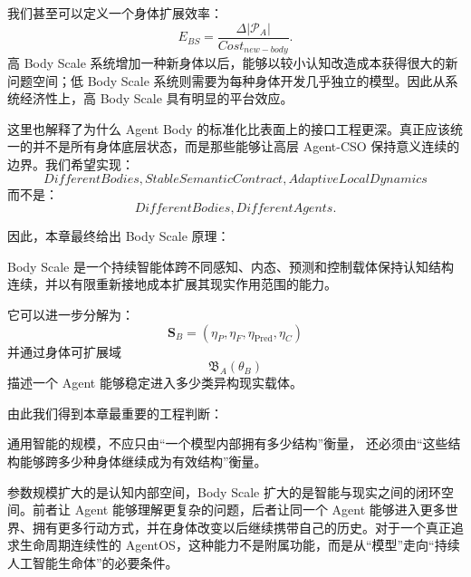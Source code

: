 我们甚至可以定义一个身体扩展效率：
\[
E_{BS}
=
\frac{
\Delta |\mathcal P_A|
}{
Cost_{new-body}
}.
\]
高 Body Scale 系统增加一种新身体以后，能够以较小认知改造成本获得很大的新问题空间；低 Body Scale 系统则需要为每种身体开发几乎独立的模型。因此从系统经济性上，高 Body Scale 具有明显的平台效应。

这里也解释了为什么 Agent Body 的标准化比表面上的接口工程更深。真正应该统一的并不是所有身体底层状态，而是那些能够让高层 Agent-CSO 保持意义连续的边界。我们希望实现：
\[
\boxed{
DifferentBodies,
StableSemanticContract,
AdaptiveLocalDynamics
}
\]
而不是：
\[
\boxed{
DifferentBodies,
DifferentAgents.
}
\]

因此，本章最终给出 Body Scale 原理：

\begin{statementbox}
Body Scale 是一个持续智能体跨不同感知、内态、预测和控制载体保持认知结构连续，并以有限重新接地成本扩展其现实作用范围的能力。
\end{statementbox}

它可以进一步分解为：
\[
\boxed{
\mathbf S_B
=
(
\eta_P,
\eta_F,
\eta_{\mathrm{Pred}},
\eta_C
)
}
\]
并通过身体可扩展域
\[
\mathfrak B_A(\theta_B)
\]
描述一个 Agent 能够稳定进入多少类异构现实载体。

由此我们得到本章最重要的工程判断：

\begin{proposition*}
通用智能的规模，不应只由“一个模型内部拥有多少结构”衡量，
还必须由“这些结构能够跨多少种身体继续成为有效结构”衡量。
\end{proposition*}

参数规模扩大的是认知内部空间，Body Scale 扩大的是智能与现实之间的闭环空间。前者让 Agent 能够理解更复杂的问题，后者让同一个 Agent 能够进入更多世界、拥有更多行动方式，并在身体改变以后继续携带自己的历史。对于一个真正追求生命周期连续性的 AgentOS，这种能力不是附属功能，而是从“模型”走向“持续人工智能生命体”的必要条件。
